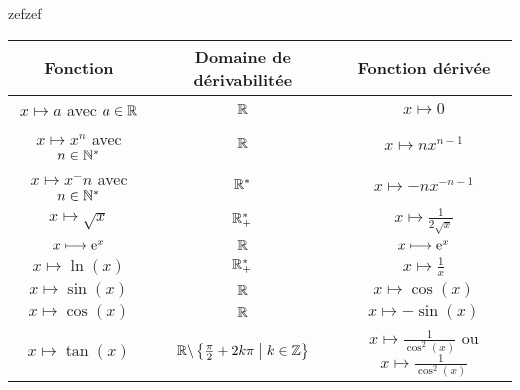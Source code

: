 \begin{defprop}
	\rule{0pt}{50pt}
	zefzef
	\begin{tabular}{|c|c|c|}

		\hline
		\textbf{Fonction}                    & \textbf{Domaine de dérivabilitée}                 & \textbf{Fonction dérivée}                                             \\
		\hline
		\(x\mapsto a\) avec \(a \in \mathbb{R}\)     & \(\mathbb{R}\)                                            & \(x\mapsto 0\)                                                        \\
		\hline
		\(x\mapsto x^n\) avec \(n \in \mathbb{N}^*\)  & \(\mathbb{R}\)                                            & \(x\mapsto nx^{n-1}\)                                                 \\
		\hline
		\(x\mapsto x^-n\) avec \(n \in \mathbb{N}^*\) & \(\mathbb{R}^*\)                                           & \(x\mapsto -nx^{-n-1}\)                                               \\
		\hline
		\(x\mapsto \sqrt{x}\)                & \(\mathbb{R}_+^*\)                                          & \(x\mapsto \frac{1}{2\sqrt{x}}\)                                      \\
		\hline
		\(x\longmapsto \mathrm{e}^{x}\)                   & \(\mathbb{R}\)                                            & \(x\longmapsto \mathrm{e}^{x}\)                                                    \\
		\hline
		\(x\mapsto \ln(x)\)                  & \(\mathbb{R}_+^*\)                                          & \(x\mapsto \frac{1}{x}\)                                              \\
		\hline
		\(x\mapsto \sin(x)\)                 & \(\mathbb{R}\)                                            & \(x\mapsto \cos(x)\)                                                  \\
		\hline
		\(x\mapsto \cos(x)\)                 & \(\mathbb{R}\)                                            & \(x\mapsto -\sin(x)\)                                                 \\
		\hline
		\(x\mapsto \tan(x)\)                 & \(\mathbb{R}\backslash\left\lbrace\frac{\pi}{2}+2k\pi \;\middle|\; k \in \mathbb{Z}\right\rbrace\) & \(x\mapsto \frac{1}{\cos^2(x)} \) ou \(x\mapsto \frac{1}{\cos^2(x)}\) \\
		\hline
	\end{tabular}



\end{defprop}


